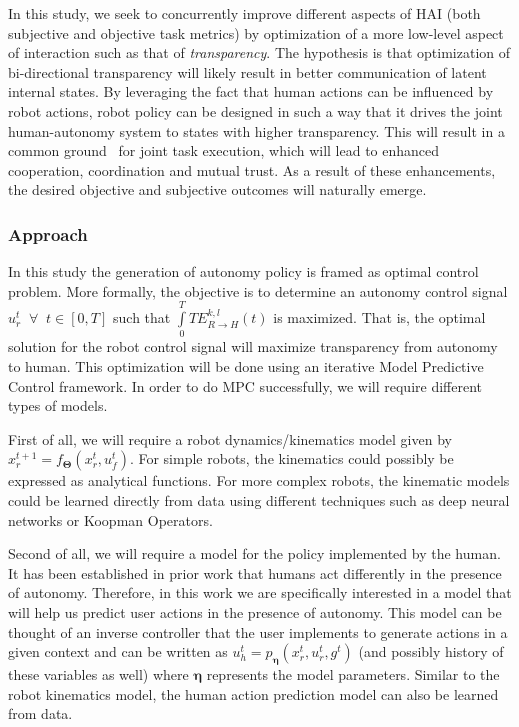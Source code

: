 \documentclass[12pt]{article}
\begin{document}
In this study, we seek to concurrently improve
different aspects of HAI (both subjective and objective task metrics) by optimization of a more low-level aspect of interaction such as that of  \textit{transparency}. The hypothesis is that optimization of bi-directional transparency will likely result in better communication of latent internal states. By leveraging the fact that human actions can be influenced by robot actions, robot policy can be designed in such a way that it drives the joint human-autonomy system to states with higher transparency. This will result in a common ground~\cite{kiesler2005fostering} for joint task execution, which will lead to enhanced cooperation, coordination and mutual trust. As a result of these enhancements, the desired objective and subjective outcomes will naturally emerge.


\subsubsection{Approach}
In this study the generation of autonomy policy is framed as optimal control problem. More formally, the objective is to determine an autonomy control signal 
$u_r^t \;\;\forall \;\; t \in [0, T]$ such that $\int\limits_{0}^{T} TE_{R \rightarrow H}^{k, l}(t)$ is maximized. That is, the optimal solution for the robot control signal will maximize transparency from autonomy to human. This optimization will be done using an iterative Model Predictive Control framework. In order to do MPC successfully, we will require different types of models. 

First of all, we will require a robot dynamics/kinematics model given by $x_r^{t+1} = f_{\boldsymbol{\Theta}}(x_r^t, u_f^t)$. For simple robots, the kinematics could possibly be expressed as analytical functions. For more complex robots, the kinematic models could be learned directly from data using different techniques such as deep neural networks or Koopman Operators. 

Second of all, we will require a model for the policy implemented by the human. It has been established in prior work that humans act differently in the presence of autonomy. Therefore, in this work we are specifically interested in a model that will help us predict user actions in the presence of autonomy. This model can be thought of an inverse controller that the user implements to generate actions in a given context and can be written as $u_h^{t} = p_{\boldsymbol{\eta}}(x_r^t, u_r^t, g^t)$ (and possibly history of these variables as well) where $\boldsymbol{\eta}$ represents the model parameters. Similar to the robot kinematics model, the human action prediction model can also be learned from data.
\end{document}
